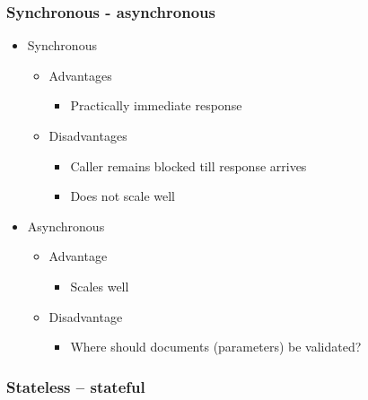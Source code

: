 \hypertarget{synchronous---asynchronous}{%
\subsubsection{Synchronous -
asynchronous}\label{synchronous---asynchronous}}

\begin{itemize}
\tightlist
\item
  Synchronous

  \begin{itemize}
  \tightlist
  \item
    Advantages

    \begin{itemize}
    \tightlist
    \item
      Practically immediate response
    \end{itemize}
  \item
    Disadvantages

    \begin{itemize}
    \tightlist
    \item
      Caller remains blocked till response arrives
    \item
      Does not scale well
    \end{itemize}
  \end{itemize}
\item
  Asynchronous

  \begin{itemize}
  \tightlist
  \item
    Advantage

    \begin{itemize}
    \tightlist
    \item
      Scales well
    \end{itemize}
  \item
    Disadvantage

    \begin{itemize}
    \tightlist
    \item
      Where should documents (parameters) be validated?
    \end{itemize}
  \end{itemize}
\end{itemize}

\hypertarget{stateless-stateful}{%
\subsubsection{Stateless -- stateful}\label{stateless-stateful}}

